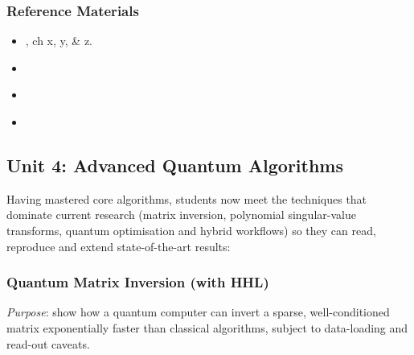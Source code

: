 \subsubsection{Reference Materials}
\begin{itemize}
	\item \citeauthor{Lipton:2021} \citeauthor{Lipton:2021}, ch x, y, \& z.
	\item \citeauthor{Nielsen:2010} \citeauthor{Nielsen:2010}
	\item \citeauthor{Shor:1997} 
	\item \citeauthor{Grover:1996} 
\end{itemize}

\subsection{Unit 4: Advanced Quantum Algorithms}

Having mastered core algorithms, students now meet the techniques that dominate current research
(matrix inversion, polynomial singular-value transforms, quantum optimisation and hybrid workflows)
so they can read, reproduce and extend state-of-the-art results:

\subsubsection{Quantum Matrix Inversion (with HHL)}

\emph{Purpose}: show how a quantum computer can invert a sparse, well-conditioned matrix
 exponentially faster than classical algorithms, subject to data-loading and read-out caveats.
 

